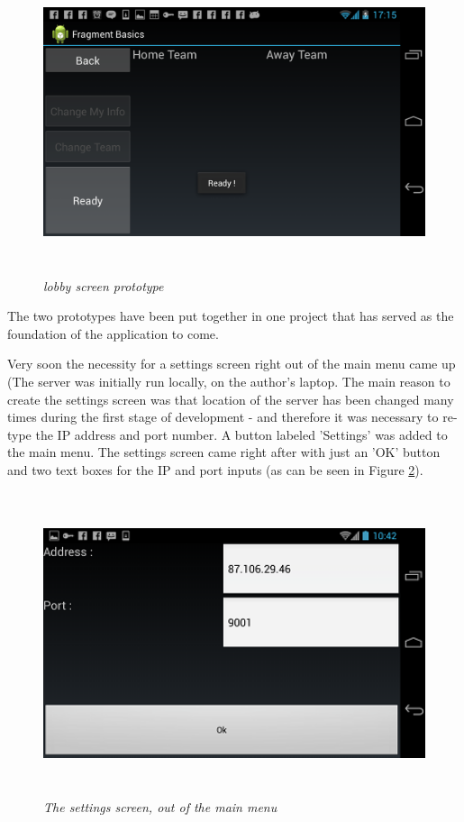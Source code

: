 \begin{figure}
\includegraphics[height=3.5in,width=6.23in]{./images/android_screenshots/menu_prototype/MENU_prototype_2.png}  
\caption{\small \sl lobby screen prototype \label{fig:menuPrototype2}}
\end{figure}

The two prototypes have been put together in one project that has served as the
foundation of the application to come.\newline

Very soon the necessity for a settings screen right out of the main menu came up
(The server was initially run locally, on the author's laptop. The main reason
to create the settings screen was that location of the server has been changed
many times during the first stage of development - and therefore it was
necessary to re-type the IP address and port number. A button labeled 'Settings'
was added to the main menu. The settings screen came right after with just an
'OK' button and two text boxes for the IP and port inputs (as can be seen in
Figure \ref{fig:main_menu_settings}).\newline

\begin{figure}
\includegraphics[height=3.5in,width=6.23in]{./images/android_screenshots/tutorial_main_settings.png}  
\caption{\small \sl The settings screen, out of the main
menu\label{fig:main_menu_settings}}
\end{figure}

